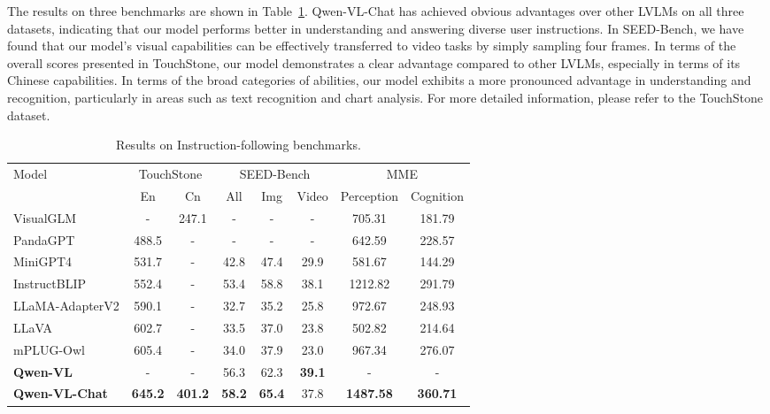 \documentclass{article}
\newcommand{\tablestyle}[2]{\setlength{\tabcolsep}{#1}\renewcommand{\arraystretch}{#2}\centering\footnotesize}
\begin{document}
The results on three benchmarks are shown in Table~\ref{tab:intruction_following}.  Qwen-VL-Chat has achieved obvious advantages over other LVLMs on all three datasets, indicating that our model performs better in understanding and answering diverse user instructions. In SEED-Bench, we have found that our model's visual capabilities can be effectively transferred to video tasks by simply sampling four frames.
 In terms of the overall scores presented in TouchStone, our model demonstrates a clear advantage compared to other LVLMs, especially in terms of its Chinese capabilities. In terms of the broad categories of abilities, our model exhibits a more pronounced advantage in understanding and recognition, particularly in areas such as text recognition and chart analysis. For more detailed information, please refer to the TouchStone dataset.

 

\begin{table}[]
\centering
\tablestyle{5pt}{1.05}
\caption{Results on Instruction-following benchmarks.}
\begin{tabular}{@{}l|ccccccc@{}}
\toprule
\multirow{2}{*}{Model} & \multicolumn{2}{c}{TouchStone} & \multicolumn{3}{c}{SEED-Bench} & \multicolumn{2}{c}{MME}   \\
 &  En&Cn & All & Img &Video & Perception & Cognition \\ \midrule
 VisualGLM & - & 247.1 & - & - & - & 705.31  & 181.79 \\
 PandaGPT & 488.5 & - & - & -&-&642.59 &228.57  \\
 MiniGPT4 & 531.7 &- & 42.8 & 47.4 & 29.9 & 581.67&144.29  \\
 InstructBLIP&552.4 & - & 53.4 & 58.8 & 38.1 & 1212.82&291.79\\
 LLaMA-AdapterV2 &590.1 & - &32.7 & 35.2& 25.8 & 972.67 &248.93\\
 LLaVA  & 602.7 &- & 33.5 & 37.0 & 23.8 & 502.82&214.64 \\
 mPLUG-Owl & 605.4 & - & 34.0 & 37.9 & 23.0 & 967.34 & 276.07 \\ \midrule
 \textbf{Qwen-VL} & - & - & 56.3 & 62.3 &  \textbf{39.1} &  - & -   \\
 \textbf{Qwen-VL-Chat} & \textbf{645.2} & \textbf{401.2} & \textbf{58.2} & \textbf{65.4} & 37.8 &  \textbf{1487.58} & \textbf{360.71}  \\
 \bottomrule
\end{tabular}
\vspace{-0.2cm}
\label{tab:intruction_following}
\end{table}
\end{document}
